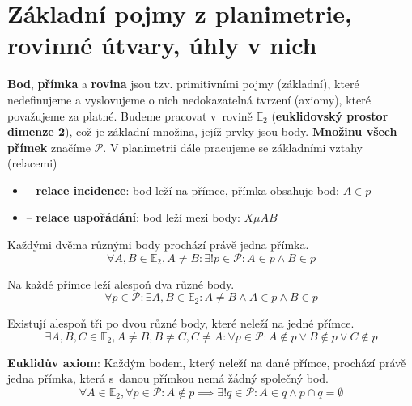 \section{Základní pojmy z planimetrie, rovinné útvary, úhly v nich}

\begin{pozn}
  \textbf{Bod}, \textbf{přímka} a \textbf{rovina} jsou tzv. primitivními pojmy (základní), které nedefinujeme a vyslovujeme o nich nedokazatelná tvrzení (axiomy), které považujeme za platné. Budeme pracovat v rovině $\mathbb E_2$ (\textbf{euklidovský prostor dimenze 2}), což je základní množina, jejíž prvky jsou body. \textbf{Množinu všech přímek} značíme $\mathscr P$. V planimetrii dále pracujeme se základními vztahy (relacemi)
  \begin{itemize}
    \item {} -- \textbf{relace incidence}: bod leží na přímce, přímka obsahuje bod: $A \in p$
    \item {} -- \textbf{relace uspořádání}: bod leží mezi body: $X \mu AB$
  \end{itemize}
\end{pozn}

\begin{axiom}
  Každými dvěma různými body prochází právě jedna přímka.
  $$\forall A, B \in \mathbb E_2, A\neq B: \exists! p \in \mathscr P: A \in p \land B \in p$$
\end{axiom}

\begin{axiom}
  Na každé přímce leží alespoň dva různé body.
  $$\forall p \in \mathscr P:\exists A,B \in \mathbb E_2: A\neq B \land A \in p \land B \in p$$
\end{axiom}

\begin{axiom}
  Existují alespoň tři po dvou různé body, které neleží na jedné přímce.
  $$\exists A,B,C \in \mathbb E_2, A \neq B, B\neq C, C\neq A: \forall p \in \mathscr P: A \notin p \lor B \notin p \lor C \notin p$$
\end{axiom}

\begin{axiom}
  \textbf{Euklidův axiom}: Každým bodem, který neleží na dané přímce, prochází právě jedna přímka, která s danou přímkou nemá žádný společný bod.
  $$\forall A \in \mathbb E_2, \forall p \in \mathscr P: A \notin p \implies \exists! q \in \mathscr P: A \in q \land p \cap q = \emptyset$$
\end{axiom}

